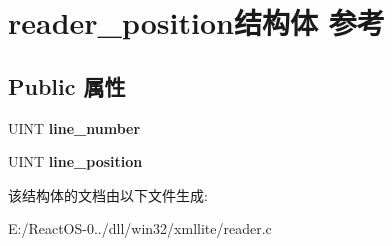 \hypertarget{structreader__position}{}\section{reader\+\_\+position结构体 参考}
\label{structreader__position}
\subsection*{Public 属性}
\begin{DoxyCompactItemize}
\item 
\mbox{\label{structreader__position_abfdeee7fc2cb660ba27df4988d662d96}} 
U\+I\+NT {\bfseries line\+\_\+number}
\item 
\mbox{\label{structreader__position_ab03f53ac99b20831de255db7575612d3}} 
U\+I\+NT {\bfseries line\+\_\+position}
\end{DoxyCompactItemize}


该结构体的文档由以下文件生成\+:\begin{DoxyCompactItemize}
\item 
E\+:/\+React\+O\+S-\/0../dll/win32/xmllite/reader.\+c\end{DoxyCompactItemize}
